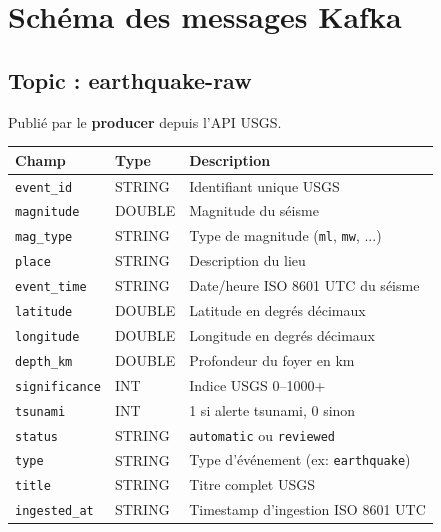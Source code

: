 \documentclass[12pt,a4paper]{article}
\begin{document}
\newpage
\appendix
\section{Schéma des messages Kafka}

\subsection{Topic : earthquake-raw}

Publié par le \textbf{producer} depuis l'API USGS.

\begin{center}
\begin{tabularx}{\textwidth}{llX}
  \toprule
  \textbf{Champ} & \textbf{Type} & \textbf{Description} \\
  \midrule
  \texttt{event\_id}   & STRING & Identifiant unique USGS \\
  \texttt{magnitude}   & DOUBLE & Magnitude du séisme \\
  \texttt{mag\_type}   & STRING & Type de magnitude (\texttt{ml}, \texttt{mw}, ...) \\
  \texttt{place}       & STRING & Description du lieu \\
  \texttt{event\_time} & STRING & Date/heure ISO 8601 UTC du séisme \\
  \texttt{latitude}    & DOUBLE & Latitude en degrés décimaux \\
  \texttt{longitude}   & DOUBLE & Longitude en degrés décimaux \\
  \texttt{depth\_km}   & DOUBLE & Profondeur du foyer en km \\
  \texttt{significance}& INT    & Indice USGS 0--1000+ \\
  \texttt{tsunami}     & INT    & 1 si alerte tsunami, 0 sinon \\
  \texttt{status}      & STRING & \texttt{automatic} ou \texttt{reviewed} \\
  \texttt{type}        & STRING & Type d'événement (ex: \texttt{earthquake}) \\
  \texttt{title}       & STRING & Titre complet USGS \\
  \texttt{ingested\_at}& STRING & Timestamp d'ingestion ISO 8601 UTC \\
  \bottomrule
\end{tabularx}
\end{center}
\end{document}
